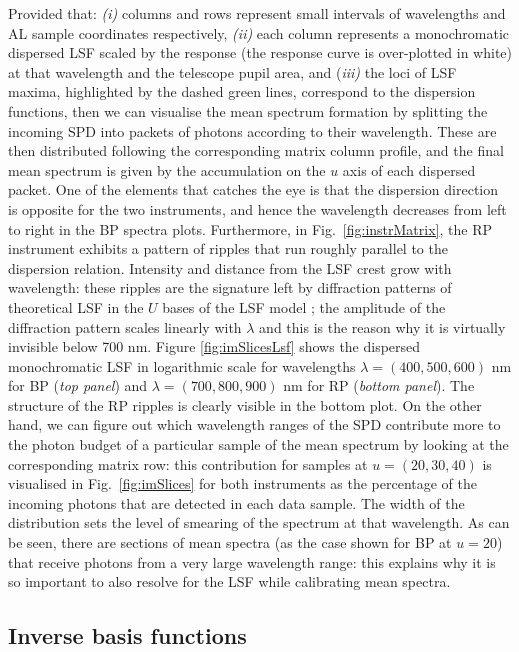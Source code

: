 \documentclass{aa}
\newcommand{\figref}[1]{Fig.~\ref{fig:#1}}
\begin{document}
Provided that: \textit{(i)} columns and rows represent small intervals of wavelengths and AL sample coordinates respectively, \textit{(ii)}
each column represents a monochromatic dispersed LSF scaled by the response (the response curve is over-plotted in white) at that wavelength and the telescope pupil area, and (\textit{iii)} the loci of LSF maxima, highlighted by the dashed green lines, correspond to the dispersion functions, then 
we can visualise the mean spectrum formation by splitting the incoming SPD into packets of photons according to their wavelength. These are then distributed following the corresponding matrix column profile, and the final mean spectrum is given by the accumulation on the $u$ axis of each dispersed packet. One of the elements that catches the eye is that the dispersion direction is opposite for the two instruments, and hence the wavelength decreases from left to right in the BP spectra plots.
Furthermore, in \figref{instrMatrix}, the RP instrument exhibits a pattern of ripples that run roughly parallel to the dispersion relation. Intensity and distance from the LSF crest grow with wavelength: these ripples are the signature
left by diffraction patterns of theoretical LSF in the  $U$ bases of the LSF model \citep{LL:PMN-012}; the amplitude of the diffraction pattern scales linearly with $\lambda$ and this is the reason why it is virtually invisible below 700 nm.
Figure \ref{fig:imSlicesLsf} shows the dispersed monochromatic LSF in logarithmic scale for wavelengths $\lambda = (400, 500, 600)$ nm for BP (\emph{top panel}) and $\lambda = (700, 800, 900)$ nm for RP (\emph{bottom panel}).
The structure of the RP ripples is clearly visible in the bottom plot.
On the other hand, we can figure out which wavelength ranges of the SPD contribute more to the photon budget of a particular sample of the mean spectrum by looking at the corresponding matrix row: this contribution for samples at $u = (20, 30, 40)$ is visualised in \figref{imSlices} for both instruments as the percentage of the incoming photons that are detected in each data sample. The width of the distribution sets the level of smearing of the spectrum at that wavelength. As can be seen, there are sections of mean spectra (as the case shown for BP at $u=20$) that receive photons from a very large wavelength range: this explains why it is so important to also resolve for the LSF while calibrating mean spectra.

\subsection{Inverse basis functions}\label{sec:invbases}
\end{document}
